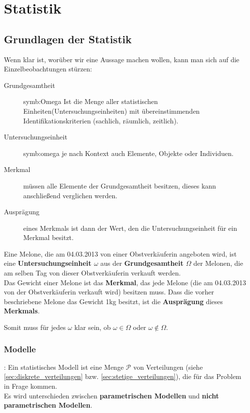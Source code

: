 \chapter{Statistik}
\section{Grundlagen der Statistik}
Wenn klar ist, worüber wir eine Aussage machen wollen, kann man sich auf die Einzelbeobachtungen stürzen:
\begin{description}
    \item [Grundgesamtheit] \gls{symb:Omega}
        Ist die Menge aller statistischen Einheiten(Untersuchungseinheiten) mit übereinstimmenden Identifikationskriterien (sachlich, räumlich, zeitlich).
    \item [Untersuchungseinheit] \gls{symb:omega}
        je nach Kontext auch Elemente, Objekte oder Individuen.
    \item [Merkmal] 
        müssen alle Elemente der Grundgesamtheit besitzen, dieses kann anschließend verglichen werden.
    \item [Ausprägung] 
    eines Merkmals ist dann der Wert, den die Untersuchungseinheit für ein Merkmal besitzt.
\end{description}

\begin{bsp}
Eine Melone, die am 04.03.2013 von einer Obstverkäuferin angeboten wird, ist eine \textbf{Untersuchungseinheit $\omega$} aus der \textbf{Grundgesamtheit $\Omega$} der Melonen, die am selben Tag von dieser Obstverkäuferin verkauft werden.\\
Das Gewicht einer Melone ist das \textbf{Merkmal}, das jede Melone (die am 04.03.2013 von der Obstverkäuferin verkauft wird) besitzen muss. Dass die vorher beschriebene Melone das Gewicht 1kg besitzt, ist die \textbf{Ausprägung} dieses \textbf{Merkmals}.
\end{bsp}

Somit muss für jedes $\omega$ klar sein, ob $\omega\in\Omega$ oder $\omega\notin\Omega$.


\subsection{Modelle}
\begin{definition}:
Ein statistisches Modell ist eine Menge $\mathcal{P}$ von Verteilungen (siehe \ref{sec:diskrete_verteilungen} bzw. \ref{sec:stetige_verteilungen}), die für das Problem in Frage kommen.\\
Es wird unterschieden zwischen \textbf{parametrischen Modellen} und \textbf{nicht parametrischen Modellen}.
\end{definition}


